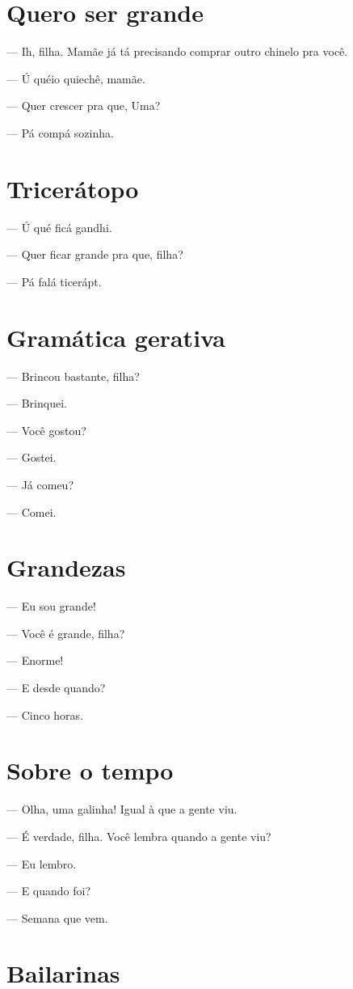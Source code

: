 \chapter{Quero ser grande}
{\parindent0pt
— Ih, filha. Mamãe já tá precisando comprar outro chinelo pra você.

— Ú quéio quiechê, mamãe.

— Quer crescer pra que, Uma?

— Pá compá sozinha.

\chapter{Tricerátopo}

— Ú qué ficá gandhi.

— Quer ficar grande pra que, filha?

— Pá falá ticerápt.

\chapter{Gramática gerativa}

— Brincou bastante, filha?

— Brinquei.

— Você gostou?

— Gostei.

— Já comeu?

— Comei.

\chapter{Grandezas}

— Eu sou grande!

— Você é grande, filha?

— Enorme!

— E desde quando?

— Cinco horas.

\chapter{Sobre o tempo}

— Olha, uma galinha! Igual à que a gente viu.

— É verdade, filha. Você lembra quando a gente viu?

— Eu lembro.

— E quando foi?

— Semana que vem.

\chapter{Bailarinas}

}
